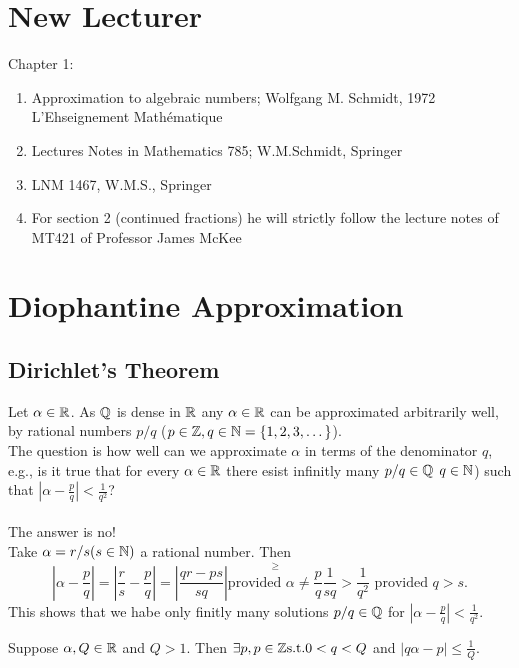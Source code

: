 \documentclass[NumTh.tex]{subfiles}
\begin{document}
\section*{New Lecturer}
Chapter 1:
\begin{enumerate}
  \item Approximation to algebraic numbers; Wolfgang M. Schmidt, 1972 L'Ehseignement Mathématique
  \item Lectures Notes in Mathematics 785; W.M.Schmidt, Springer
  \item LNM 1467, W.M.S., Springer
  \item For section 2 (continued fractions) he will strictly follow the lecture notes of MT421 of Professor James McKee
\end{enumerate}

\section{Diophantine Approximation}

\subsection{Dirichlet's Theorem}

Let $\alpha \in \mathbb{R}$. As $\mathbb{Q}$ is dense in $\mathbb{R}$ any $\alpha \in \mathbb{R}$ can be approximated arbitrarily well, by rational numbers $p/q$ ($p \in \mathbb{Z}, q \in \mathbb{N} = \{1,2,3,\dots\}$).\\
The question is how well can we approximate $\alpha$ in terms of the denominator $q$, e.g., is it true that for every $\alpha \in \mathbb{R}$ there esist infinitly many $p/q \in \mathbb{Q}$ $q\in \mathbb{N}$) such that $| \alpha - \frac{p}{q} | < \frac{1}{q^2}$?\\
\\
The answer is no!\\
Take $\alpha = r/s (s \in \mathbb{N})$ a rational number. Then 
\[ | \alpha - \frac{p}{q} | = |\frac{r}{s} - \frac{p}{q} | = | \frac{qr -ps}{sq} | \overset{\geq}{\text{provided } \alpha \neq \frac{p}{q}} \frac{1}{sq}  > \frac{1}{q^2} \text{ provided } q > s.\]
This shows that we habe only finitly many solutions $p/q \in \mathbb{Q}$ for $| \alpha -\frac{p}{q} | < \frac{1}{q^2}$.

\begin{theorem}
  Suppose $\alpha,Q \in \mathbb{R}$ and $Q > 1$. Then $\exists p,p \in \mathbb{Z} \text{s.t.} 0< q<Q$ and $| q\alpha - p | \leq \frac{1}{Q}$.
\end{theorem}
\end{document}
